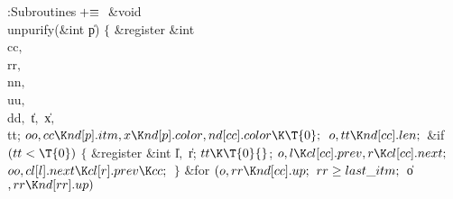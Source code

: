 \Y\B\4:Subroutines\X${}\mathrel+\equiv{}$\6
\&{void} \\{unpurify}(\&{int} \|p)\1\1\2\2\6
${}\{{}$\1\6
\&{register} \&{int} \\{cc}${},{}$ \\{rr}${},{}$ \\{nn}${},{}$ \\{uu}${},{}$ %
\\{dd}${},{}$ \|t${},{}$ \|x${},{}$ \\{tt};\7
${}\\{oo},\39\\{cc}\K\\{nd}[\|p].\\{itm},\39\|x\K\\{nd}[\|p].\\{color},\39%
\\{nd}[\\{cc}].\\{color}\K\T{0};{}$\6
${}\|o,\39\\{tt}\K\\{nd}[\\{cc}].\\{len};{}$\6
\&{if} ${}(\\{tt}<\T{0}){}$\5
${}\{{}$\1\6
\&{register} \&{int} \|l${},{}$ \|r;\7
${}\\{tt}\K\T{0}{}$;\6
${}\|o,\39\|l\K\\{cl}[\\{cc}].\\{prev},\39\|r\K\\{cl}[\\{cc}].\\{next};{}$\6
${}\\{oo},\39\\{cl}[\|l].\\{next}\K\\{cl}[\|r].\\{prev}\K\\{cc};{}$\6
\4${}\}{}$\2\6
\&{for} ${}(\|o,\39\\{rr}\K\\{nd}[\\{cc}].\\{up};{}$ ${}\\{rr}\G\\{last%
\_itm};{}$ \|o${},\39\\{rr}\K\\{nd}[\\{rr}].\\{up}){}$\5
